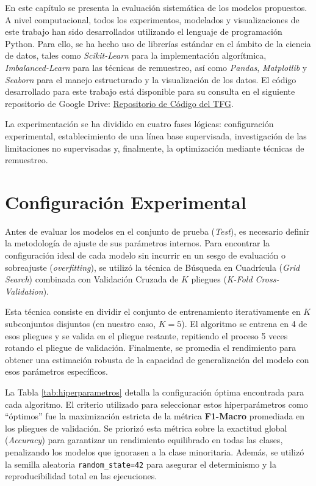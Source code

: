 \documentclass[12pt, a4paper]{report}
\begin{document}
En este capítulo se presenta la evaluación sistemática de los modelos propuestos. A nivel computacional, todos los experimentos, modelados y visualizaciones de este trabajo han sido desarrollados utilizando el lenguaje de programación Python. Para ello, se ha hecho uso de librerías estándar en el ámbito de la ciencia de datos, tales como \textit{Scikit-Learn} \citep{scikit-learn} para la implementación algorítmica, \textit{Imbalanced-Learn} para las técnicas de remuestreo, así como \textit{Pandas}, \textit{Matplotlib} y \textit{Seaborn} para el manejo estructurado y la visualización de los datos. El código desarrollado para este trabajo está disponible para su consulta en el siguiente repositorio de Google Drive: \href{https://drive.google.com/drive/folders/1zoQUG6qrf28nxJ_4eYyU2Y-u36aw-Naq?usp=drive_link}{Repositorio de Código del TFG}.

La experimentación se ha dividido en cuatro fases lógicas: configuración experimental, establecimiento de una línea base supervisada, investigación de las limitaciones no supervisadas y, finalmente, la optimización mediante técnicas de remuestreo.

\section{Configuración Experimental}

Antes de evaluar los modelos en el conjunto de prueba (\textit{Test}), es necesario definir la metodología de ajuste de sus parámetros internos. Para encontrar la configuración ideal de cada modelo sin incurrir en un sesgo de evaluación o sobreajuste (\textit{overfitting}), se utilizó la técnica de Búsqueda en Cuadrícula (\textit{Grid Search}) combinada con Validación Cruzada de $K$ pliegues (\textit{K-Fold Cross-Validation}). 

Esta técnica consiste en dividir el conjunto de entrenamiento iterativamente en $K$ subconjuntos disjuntos (en nuestro caso, $K=5$). El algoritmo se entrena en 4 de esos pliegues y se valida en el pliegue restante, repitiendo el proceso 5 veces rotando el pliegue de validación. Finalmente, se promedia el rendimiento para obtener una estimación robusta de la capacidad de generalización del modelo con esos parámetros específicos.

La Tabla \ref{tab:hiperparametros} detalla la configuración óptima encontrada para cada algoritmo. El criterio utilizado para seleccionar estos hiperparámetros como ``óptimos'' fue la maximización estricta de la métrica \textbf{F1-Macro} promediada en los pliegues de validación. Se priorizó esta métrica sobre la exactitud global (\textit{Accuracy}) para garantizar un rendimiento equilibrado en todas las clases, penalizando los modelos que ignorasen a la clase minoritaria. Además, se utilizó la semilla aleatoria \texttt{random\_state=42} para asegurar el determinismo y la reproducibilidad total en las ejecuciones.
\end{document}
